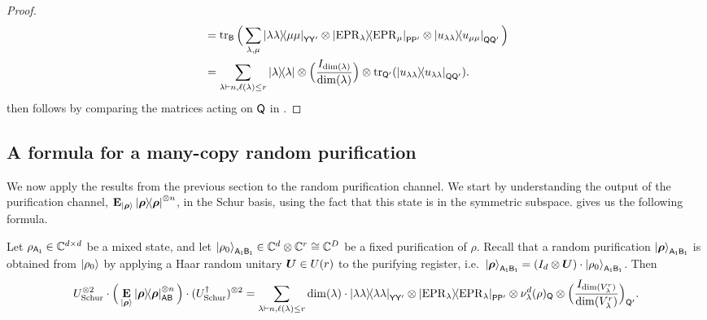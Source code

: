 \begin{proof}
\begin{align}
    & = \tr_{\mathsf{B}} \Big( \sum_{\lambda, \mu} \ketbra{\lambda \lambda}{\mu \mu}_{\mathsf{YY'}} \otimes \ketbra{\mathrm{EPR}_\lambda}{\mathrm{EPR}_{\mu}}_{\mathsf{PP'}} \otimes \ketbra{u_{\lambda \lambda}}{u_{\mu \mu}}_{\mathsf{QQ'}} \Big) \nonumber \\
    & = \sum_{\lambda \vdash n, \ell(\lambda) \leq r} \ketbra{\lambda} \otimes \Big( \frac{I_{\dim(\lambda)}}{\dim(\lambda)} \Big) \otimes \tr_{\mathsf{Q'}} (\ketbra{u_{\lambda \lambda}}_{\mathsf{QQ'}}). \label{eq:double_schur_eq_2}
\end{align}
 then follows by comparing the matrices acting on $\mathsf{Q}$ in .
\end{proof}

\subsection{A formula for a many-copy random purification}

We now apply the results from the previous section to the random purification channel. We start by understanding the output of the purification channel, $\mathop{\bf E\/}_{\ket{\boldsymbol{\rho}}} \ketbra{\boldsymbol{\rho}}^{\otimes n}$, in the Schur basis, using the fact that this state is in the symmetric subspace. 
\cite[Lemma 2.16]{TWZ25} gives us the following formula. 

\begin{lemma}\label{lem:final-formula}
Let $\rho_{\mathsf{A_1}} \in \mathbb C^{d \times d}$ be a mixed state, and let $\ket{\rho_0}_{\mathsf{A_1B_1}} \in \mathbb C^d \otimes \mathbb C^r \cong \mathbb C^D$ be a fixed purification of $\rho$. Recall that a random purification $\ket{\boldsymbol{\rho}}_{\mathsf{A_1B_1}}$ is obtained from $\ket{\rho_0}$ by applying a Haar random unitary $\boldsymbol{U} \in U(r)$ to the purifying register, i.e.\ $\ket{\boldsymbol{\rho}}_{\mathsf{A_1B_1}} = (I_d \otimes \boldsymbol{U}) \cdot \ket{\rho_0}_{\mathsf{A_1B_1}}$. Then 
\begin{equation*} 
    U_{\mathrm{Schur}}^{\otimes 2} \cdot\Big(\mathop{\bf E\/}_{\ket{\boldsymbol{\rho}}} \ketbra{\boldsymbol{\rho}}_{\mathsf{AB}}^{\otimes n}\Big) \cdot (U_{\mathrm{Schur}}^\dagger)^{\otimes 2}
        = \sum_{\lambda \vdash n, \ell(\lambda)\leq r} \dim(\lambda) \cdot \ketbra{\lambda\lambda}_{\mathsf{Y} \mathsf{Y'}} \otimes \ketbra{\mathrm{EPR}_{\lambda}}_{\mathsf{P}\mathsf{P'}} \otimes \nu^d_{\lambda}(\rho)_{\mathsf{Q}} \otimes \Big(\frac{I_{\dim(V_{\lambda}^r)}}{\dim(V_{\lambda}^r)}\Big)_{\mathsf{Q'}}.
\end{equation*}
\end{lemma}

